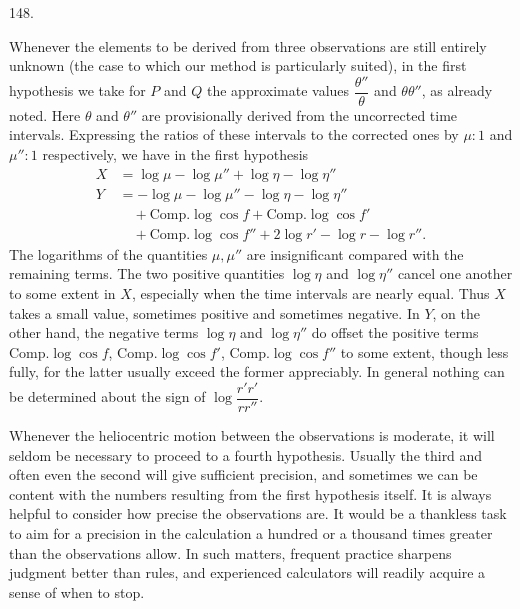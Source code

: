 \par{}\medskip
\begin{center}\hypertarget{native-198-article148}{}148.\end{center}
Whenever the elements to be derived from three observations are still entirely unknown (the case to which our method is particularly suited), in the first hypothesis we take for $P$ and $Q$ the approximate values $\dfrac{\theta''}{\theta}$ and $\theta\theta''$, as already noted. Here $\theta$ and $\theta''$ are provisionally derived from the uncorrected time intervals. Expressing the ratios of these intervals to the corrected ones by $\mu:1$ and $\mu'':1$ respectively, we have in the first hypothesis
\[
\begin{aligned}
X&=\log\mu-\log\mu''+\log\eta-\log\eta''\\
Y&=-\log\mu-\log\mu''-\log\eta-\log\eta''\\
&\quad+\mathrm{Comp.}\log\cos f+\mathrm{Comp.}\log\cos f'\\
&\quad+\mathrm{Comp.}\log\cos f''+2\log r'-\log r-\log r''.
\end{aligned}
\]
The logarithms of the quantities $\mu,\mu''$ are insignificant compared with the remaining terms. The two positive quantities $\log\eta$ and $\log\eta''$ cancel one another to some extent in $X$, especially when the time intervals are nearly equal. Thus $X$ takes a small value, sometimes positive and sometimes negative. In $Y$, on the other hand, the negative terms $\log\eta$ and $\log\eta''$ do offset the positive terms $\mathrm{Comp.}\log\cos f$, $\mathrm{Comp.}\log\cos f'$, $\mathrm{Comp.}\log\cos f''$ to some extent, though less fully, for the latter usually exceed the former appreciably. In general nothing can be determined about the sign of $\log\dfrac{r'r'}{rr''}$.

Whenever the heliocentric motion between the observations is moderate, it will seldom be necessary to proceed to a fourth hypothesis. Usually the third and often
even the second will give sufficient precision, and sometimes we can be content with the numbers resulting from the first hypothesis itself. It is always helpful to consider how precise the observations are. It would be a thankless task to aim for a precision in the calculation a hundred or a thousand times greater than the observations allow. In such matters, frequent practice sharpens judgment better than rules, and experienced calculators will readily acquire a sense of when to stop.
